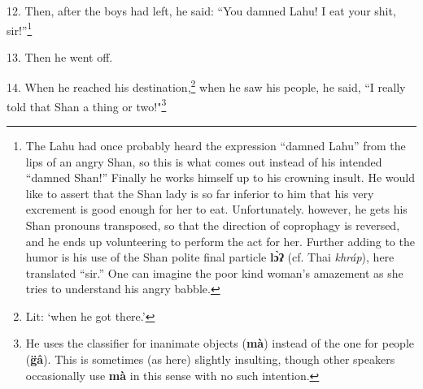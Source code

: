 12. Then, after the boys had left, he said: ``You damned Lahu! I eat your
shit, sir!''\footnote{The Lahu had once probably heard the expression ``damned Lahu'' from the lips of an angry Shan, so this is what comes out instead of his intended ``damned Shan!'' Finally he works himself up to his crowning insult. He would like to assert that the Shan lady is so far inferior to him that his very excrement is good enough for her to eat. Unfortunately. however, he gets his Shan pronouns transposed, so that the direction of coprophagy is reversed, and he ends up volunteering to perform the act for her. Further adding to the humor is his use of the Shan polite final particle \textbf{lɔ̀ʔ} (cf. Thai \textit{khráp}), here translated ``sir.'' One can imagine the poor kind woman's amazement as she tries to understand his angry babble.}


13. Then he went off.

14. When he reached his destination,\footnote{Lit: `when he got there.'} when he saw his people, he said, ``I
really told that Shan a thing or two!"\footnote{He uses the classifier for inanimate objects (\textbf{mà}) instead of the one for people (\textbf{g̈â}). This is sometimes (as here) slightly insulting, though other speakers occasionally use \textbf{mà} in this sense with no such intention.}

